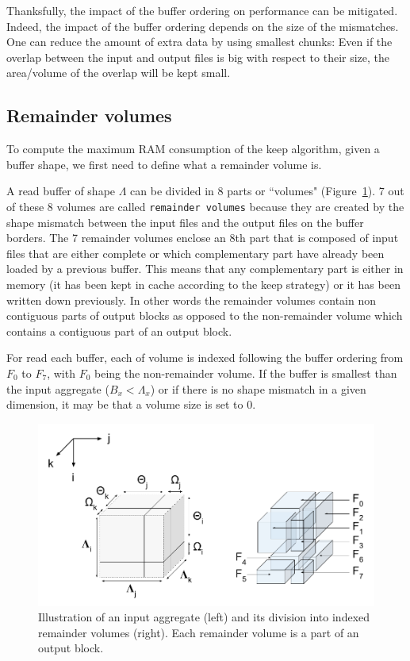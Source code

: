 \documentclass[conference]{IEEEtran}
\begin{document}
Thanksfully, the impact of the buffer ordering on performance can be
mitigated. Indeed, the impact of the buffer ordering depends on the size of the
mismatches. One can reduce the amount of extra data by using smallest chunks: Even
if the overlap between the input and output files is big with respect to their
size, the area/volume of the overlap will be kept small.

\subsection{Remainder volumes}
To compute the maximum RAM consumption of the keep algorithm, given a
buffer shape, we first need to define what a remainder volume is.

A read buffer of shape $\Lambda$ can be divided in
8 parts or ``volumes" (Figure~\ref{fig:nomenclature_overlaps}).
7 out of these 8 volumes are called \texttt{remainder volumes} because
they are created by the shape mismatch between the input files and the output files on
the buffer borders.
The 7 remainder volumes enclose an 8th part that is composed of
input files that are either complete or which complementary part have already
been loaded by a previous buffer. This means that any complementary part is either
in memory (it has been kept in cache according to the keep strategy) or it has
been written down previously.
In other words the remainder volumes contain non contiguous parts of output blocks
as opposed to the non-remainder volume which contains a contiguous part of
an output block.

For read each buffer, each of volume
is indexed following the buffer ordering from $F_0$ to $F_7$, with $F_0$ being the
non-remainder volume. If the buffer is smallest than the input aggregate
($B_x<\Lambda_x$) or if there is no shape mismatch in a given dimension,
it may be that a volume size is set to 0.

\begin{figure}[h]
\centering
\includegraphics[scale=0.4]{./figures/new/figure_3.png}
\caption{Illustration of an input aggregate (left) and its division into indexed remainder volumes (right).
Each remainder volume is a part of an output block.}
\label{fig:nomenclature_overlaps}
\end{figure}
\end{document}
